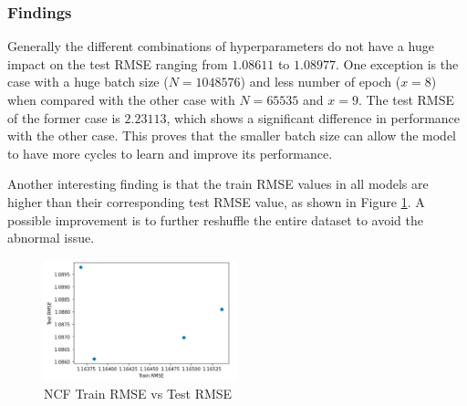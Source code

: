 \documentclass[final]{cvpr}
\begin{document}
\subsubsection{Findings}
Generally the different combinations of hyperparameters do not have a huge impact on the test RMSE ranging from $1.08611$ to $1.08977$.
One exception is the case with a huge batch size ($N=1048576$) and less number of epoch ($x = 8$)
when compared with the other case with $N=65535$ and $x=9$.
The test RMSE of the former case is $2.23113$,
which shows a significant difference in performance with the other case.
This proves that the smaller batch size can allow the model to have more cycles to learn and improve its performance.

Another interesting finding is that the train RMSE values in all models
are higher than their corresponding test RMSE value,
as shown in Figure \ref{fig:ncf-rmse-scatter}.
A possible improvement is to further reshuffle the entire dataset to avoid the abnormal issue.

\begin{figure}
	\includegraphics[width=0.5\textwidth]{screenshot20210422234958.png}
	\caption{\ac{NCF} Train \ac{RMSE} vs Test \ac{RMSE}}
	\label{fig:ncf-rmse-scatter}
\end{figure}

{\small
	
	
}
\end{document}
